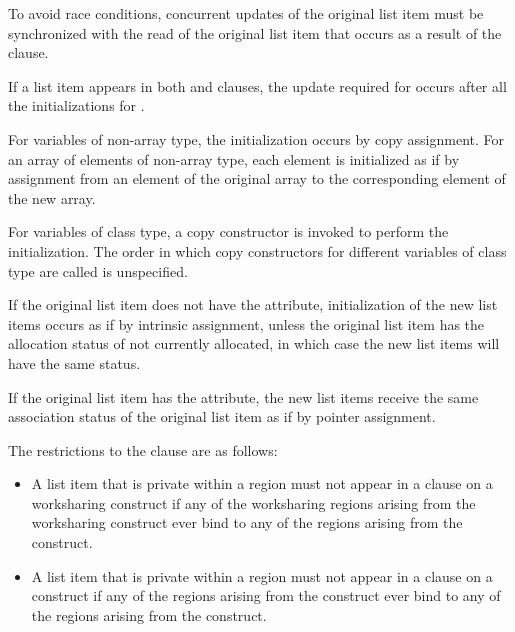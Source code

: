 {{{{To avoid race conditions, concurrent updates of the original list item must be 
synchronized with the read of the original list item that occurs as a result of the 
 clause.

If a list item appears in both  and  clauses, the update 
required for  occurs after all the initializations for .

\ccppspecificstart
For variables of non-array type, the initialization occurs by copy assignment. For an 
array of elements of non-array type, each element is initialized as if by assignment from 
an element of the original array to the corresponding element of the new array. 
\ccppspecificend

\cppspecificstart
For variables of class type, a copy constructor is invoked to perform the initialization. 
The order in which copy constructors for different variables of class type are called is 
unspecified. 
\cppspecificend

\fortranspecificstart
If the original list item does not have the  attribute, initialization of the new 
list items occurs as if by intrinsic assignment, unless the original list item has the 
allocation status of not currently allocated, in which case the new list items will have the 
same status.

If the original list item has the  attribute, the new list items receive the same 
association status of the original list item as if by pointer assignment.
\fortranspecificend

\restrictions
The restrictions to the  clause are as follows:

\begin{itemize}
\item A list item that is private within a  region must
not appear in a  clause on a worksharing construct
if any of the worksharing regions arising
from the worksharing construct ever bind to any of the
 regions arising from the  construct.

\item A list item that is private within a  region must not appear in a 
 clause on a  construct if any of the  
regions arising from the  construct ever bind to any of the  
regions arising from the  construct.


\end{itemize}}}}}
